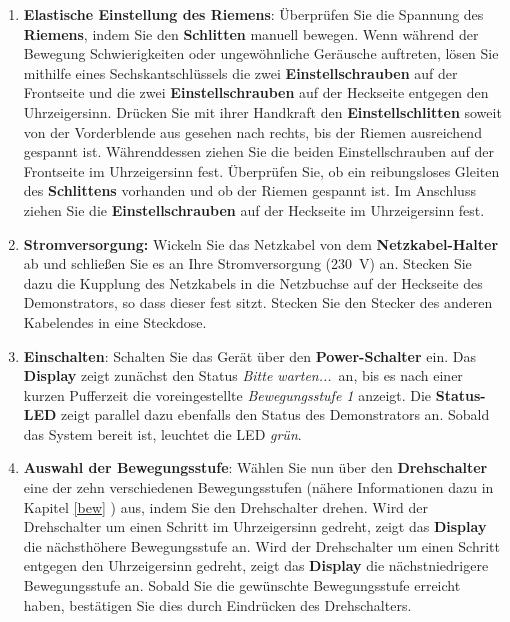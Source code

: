 \begin{enumerate} \label{STU}

	\item \textbf{Elastische Einstellung des Riemens}: Überprüfen Sie die Spannung des \textbf{Riemens}, indem Sie den \textbf{Schlitten} manuell bewegen. Wenn während der Bewegung Schwierigkeiten oder ungewöhnliche Geräusche auftreten, lösen Sie mithilfe eines Sechskantschlüssels die zwei \textbf{Einstellschrauben} auf der Frontseite und die zwei \textbf{Einstellschrauben} auf der Heckseite entgegen den Uhrzeigersinn. Drücken Sie mit ihrer Handkraft den \textbf{Einstellschlitten} soweit von der Vorderblende aus gesehen nach rechts, bis der Riemen ausreichend gespannt ist. Währenddessen ziehen Sie die beiden Einstellschrauben auf der Frontseite im Uhrzeigersinn fest. Überprüfen Sie, ob ein reibungsloses Gleiten des \textbf{Schlittens} vorhanden und ob der Riemen gespannt ist. Im Anschluss ziehen Sie die \textbf{Einstellschrauben} auf der Heckseite im Uhrzeigersinn fest. 
	
	\item \textbf{Stromversorgung:} Wickeln Sie das Netzkabel von dem \textbf{Netzkabel-Halter} ab und schließen Sie es an Ihre Stromversorgung (230\ V) an. Stecken Sie dazu die Kupplung des Netzkabels in die Netzbuchse auf der Heckseite des Demonstrators, so dass dieser fest sitzt. Stecken Sie den Stecker des anderen Kabelendes in eine Steckdose.
	
	\item \textbf{Einschalten}: Schalten Sie das Gerät über den \textbf{Power-Schalter} ein. Das \textbf{Display} zeigt zunächst den Status \glqq \textit{Bitte warten...}\grqq \ an, bis es nach einer kurzen Pufferzeit die voreingestellte \textit{\glqq Bewegungsstufe 1\grqq} anzeigt.
	Die \textbf{Status-LED} zeigt parallel dazu ebenfalls den Status des Demonstrators an. Sobald das System bereit ist, leuchtet die LED \textit{grün}.
	
	\item \textbf{Auswahl der Bewegungsstufe}: Wählen Sie nun über den \textbf{Drehschalter} eine der zehn verschiedenen Bewegungsstufen (nähere Informationen dazu in Kapitel \ref{bew} ) aus, indem Sie den Drehschalter drehen. Wird der Drehschalter um einen Schritt im Uhrzeigersinn gedreht, zeigt das \textbf{Display} die nächsthöhere Bewegungsstufe an. Wird der Drehschalter um einen Schritt entgegen den Uhrzeigersinn gedreht, zeigt das \textbf{Display} die nächstniedrigere Bewegungsstufe an. Sobald Sie die gewünschte Bewegungsstufe erreicht haben, bestätigen Sie dies durch Eindrücken des Drehschalters.	
	

\end{enumerate}
